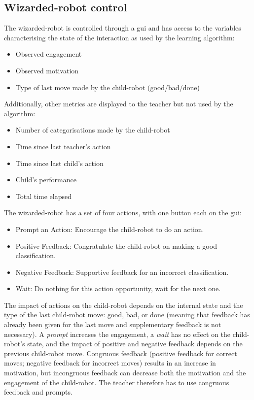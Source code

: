 \subsection{Wizarded-robot control}
\label{ssec:woz_wizarded_robot}
The wizarded-robot is controlled through a \gls{gui} and has access to the variables characterising the state of the interaction as used by the learning algorithm:
\begin{itemize}
	\item Observed engagement
	\item Observed motivation
	\item Type of last move made by the child-robot (good/bad/done)
\end{itemize}
Additionally, other metrics are displayed to the teacher but not used by the algorithm:
\begin{itemize}
	\item Number of categorisations made by the child-robot
	\item Time since last teacher's action
	\item Time since last child's action
	\item Child's performance
	\item Total time elapsed
\end{itemize}


The wizarded-robot has a set of four actions, with one button each on the \gls{gui}: 
\begin{itemize}
	\item Prompt an Action: Encourage the child-robot to do an action.
	\item Positive Feedback: Congratulate the child-robot on making a good classification.
	\item Negative Feedback: Supportive feedback for an incorrect classification.
	\item Wait: Do nothing for this action opportunity, wait for the next one.
\end{itemize}

The impact of actions on the child-robot depends on the internal state and the type of the last child-robot move: good, bad, or done (meaning that feedback has already been given for the last move and supplementary feedback is not necessary). A \textit{prompt} increases the engagement, a \textit{wait} has no effect on the child-robot's state, and the impact of positive and negative feedback depends on the previous child-robot move. Congruous feedback (positive feedback for correct moves; negative feedback for incorrect moves) results in an increase in motivation, but incongruous feedback can decrease both the motivation and the engagement of the child-robot. The teacher therefore has to use congruous feedback and prompts.

